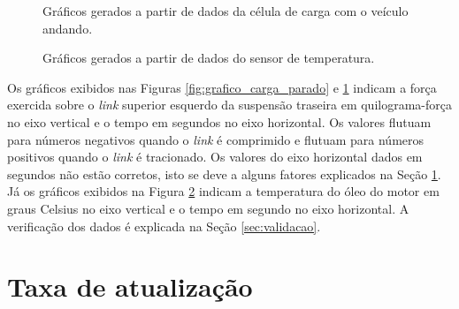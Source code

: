 \begin{figure}[!htb]
	\center
	\caption{Gráficos gerados a partir de dados da célula de carga com o veículo andando.}
	\qquad
	\qquad
	\qquad
	\label{fig:grafico_carga_andando}
\end{figure}


 \begin{figure}[!htb]
	\center
	\caption{Gráficos gerados a partir de dados do sensor de temperatura.}
	\qquad
	\label{fig:grafico_temperatura}
\end{figure}

Os gráficos exibidos nas Figuras \ref{fig:grafico_carga_parado} e \ref{fig:grafico_carga_andando} indicam a força exercida sobre o \textit{link} superior esquerdo da suspensão traseira em quilograma-força no eixo vertical e o tempo em segundos no eixo horizontal. Os valores flutuam para números negativos quando o \textit{link} é comprimido e flutuam para números positivos quando o \textit{link} é tracionado. Os valores do eixo horizontal dados em segundos não estão corretos, isto se deve a alguns fatores explicados na Seção \ref{sec:taxa}. Já os gráficos exibidos na Figura \ref{fig:grafico_temperatura} indicam a temperatura do óleo do motor em graus Celsius no eixo vertical e o tempo em segundo no eixo horizontal. A verificação dos dados é explicada na Seção \ref{sec:validacao}. 

\section{Taxa de atualização}
\label{sec:taxa}

